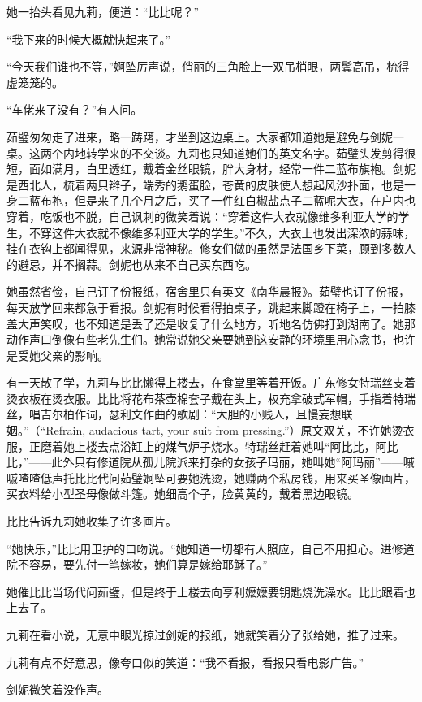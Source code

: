 \par 她一抬头看见九莉，便道：“比比呢？”
\par “我下来的时候大概就快起来了。”
\par “今天我们谁也不等，”婀坠厉声说，俏丽的三角脸上一双吊梢眼，两鬓高吊，梳得虚笼笼的。
\par “车佬来了没有？”有人问。
\par 茹璧匆匆走了进来，略一踌躇，才坐到这边桌上。大家都知道她是避免与剑妮一桌。这两个内地转学来的不交谈。九莉也只知道她们的英文名字。茹璧头发剪得很短，面如满月，白里透红，戴着金丝眼镜，胖大身材，经常一件二蓝布旗袍。剑妮是西北人，梳着两只辫子，端秀的鹅蛋脸，苍黄的皮肤使人想起风沙扑面，也是一身二蓝布袍，但是来了几个月之后，买了一件红白椒盐点子二蓝呢大衣，在户内也穿着，吃饭也不脱，自己讽刺的微笑着说：“穿着这件大衣就像维多利亚大学的学生，不穿这件大衣就不像维多利亚大学的学生。”不久，大衣上也发出深浓的蒜味，挂在衣钩上都闻得见，来源非常神秘。修女们做的虽然是法国乡下菜，顾到多数人的避忌，并不搁蒜。剑妮也从来不自己买东西吃。
\par 她虽然省俭，自己订了份报纸，宿舍里只有英文《南华晨报》。茹璧也订了份报，每天放学回来都急于看报。剑妮有时候看得拍桌子，跳起来脚蹬在椅子上，一拍膝盖大声笑叹，也不知道是丢了还是收复了什么地方，听地名仿佛打到湖南了。她那动作声口倒像有些老先生们。她常说她父亲要她到这安静的环境里用心念书，也许是受她父亲的影响。
\par 有一天散了学，九莉与比比懒得上楼去，在食堂里等着开饭。广东修女特瑞丝支着烫衣板在烫衣服。比比将花布茶壶棉套子戴在头上，权充拿破式军帽，手指着特瑞丝，唱吉尔柏作词，瑟利文作曲的歌剧：“大胆的小贱人，且慢妄想联姻。”（“Refrain, audacious tart, your suit from pressing.”）原文双关，不许她烫衣服，正磨着她上楼去点浴缸上的煤气炉子烧水。特瑞丝赶着她叫“阿比比，阿比比，”——此外只有修道院从孤儿院派来打杂的女孩子玛丽，她叫她“阿玛丽”——嘁嘁喳喳低声托比比代问茹璧婀坠可要她洗烫，她赚两个私房钱，用来买圣像画片，买衣料给小型圣母像做斗篷。她细高个子，脸黄黄的，戴着黑边眼镜。
\par 比比告诉九莉她收集了许多画片。
\par “她快乐，”比比用卫护的口吻说。“她知道一切都有人照应，自己不用担心。进修道院不容易，要先付一笔嫁妆，她们算是嫁给耶稣了。”
\par 她催比比当场代问茹璧，但是终于上楼去向亨利嬷嬷要钥匙烧洗澡水。比比跟着也上去了。
\par 九莉在看小说，无意中眼光掠过剑妮的报纸，她就笑着分了张给她，推了过来。
\par 九莉有点不好意思，像夸口似的笑道：“我不看报，看报只看电影广告。”
\par 剑妮微笑着没作声。
